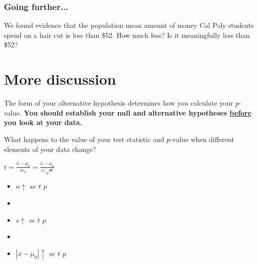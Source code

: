 \begin{frame}
\frametitle{Going further...}
We found evidence that the population mean amount of money Cal Poly students spend on a hair cut is less than \$52.  How much less?  Is it meaningfully less than \$52?
\vskip200pt
\end{frame}

\section[More discussion]{More discussion}
\begin{frame}
\end{frame}






\begin{frame}
The form of your alternative hypothesis determines how you calculate your $p$-value.
\vskip140pt
\textbf{You should establish  your null and alternative hypotheses \underline{before} you look at your data.}
\end{frame}



\begin{frame}
What happens to the value of your test statistic and $p\mbox{-value}$ when different elements of your data change?
\begin{center}
$\displaystyle t = \frac{\bar{x}-\mu_0}{se_{\bar{x}}}=\frac{\bar{x}-\mu_0}{s/\sqrt{n}}$
\end{center}
\begin{itemize}
    \item
    $n \uparrow$ \hspace{0.1in}  $se$ \hspace{0.2in} $t$ \hspace{0.2in} $p$ \hspace{0.2in}
    \item[]
    \item
    $s \uparrow$ \hspace{0.1in}  $se$ \hspace{0.2in} $t$ \hspace{0.2in} $p$ \hspace{0.2in}
    \item[]
    \item
    $|\bar{x}-\mu_0| \uparrow$ \hspace{0.1in}  $se$ \hspace{0.2in} $t$ \hspace{0.2in} $p$ \hspace{0.2in}
\end{itemize}
\end{frame}

